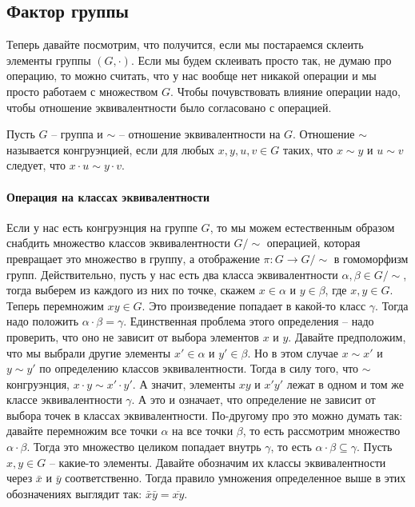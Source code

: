 \subsection{Фактор группы}
\label{section::QuotientGroup}

Теперь давайте посмотрим, что получится, если мы постараемся склеить элементы группы $(G, \cdot)$.
Если мы будем склеивать просто так, не думаю про операцию, то можно считать, что у нас вообще нет никакой операции и мы просто работаем с множеством $G$.
Чтобы почувствовать влияние операции надо, чтобы отношение эквивалентности было согласовано с операцией.

\begin{definition}
\label{def::Congruence}
Пусть $G$ -- группа и $\sim$ -- отношение эквивалентности на $G$.
Отношение $\sim$ называется конгруэнцией, если для любых $x,y,u,v\in G$ таких, что $x\sim y$ и $u\sim v$ следует, что $x \cdot u \sim y \cdot v$.
\end{definition}

\paragraph{Операция на классах эквивалентности}

Если у нас есть конгруэнция на группе $G$, то мы можем естественным образом снабдить множество классов эквивалентности $G/{\sim}$ операцией, которая превращает это множество в группу, а отображение $\pi \colon G\to G/{\sim}$ в гомоморфизм групп.
Действительно, пусть у нас есть два класса эквивалентности $\alpha,\beta\in G/{\sim}$, тогда выберем из каждого из них по точке, скажем $x\in \alpha$ и $y\in \beta$, где $x,y\in G$.
Теперь перемножим $xy\in G$.
Это произведение попадает в какой-то класс $\gamma$.
Тогда надо положить $\alpha\cdot \beta=\gamma$.
Единственная проблема этого определения -- надо проверить, что оно не зависит от выбора элементов $x$ и  $y$.
Давайте предположим, что мы выбрали другие элементы $x'\in \alpha$ и $y'\in \beta$.
Но в этом случае $x\sim x'$ и $y\sim y'$ по определению классов эквивалентности.
Тогда в силу того, что $\sim$ конгруэнция, $x\cdot y \sim x' \cdot y'$.
А значит, элементы $xy$ и $x'y'$ лежат в одном и том же классе эквивалентности $\gamma$.
А это и означает, что определение не зависит от выбора точек в классах эквивалентности.
По-другому про это можно думать так: давайте перемножим все точки $\alpha$ на все точки $\beta$, то есть рассмотрим множество $\alpha \cdot \beta$.
Тогда это множество целиком попадает внутрь $\gamma$, то есть $\alpha \cdot \beta \subseteq \gamma$.
Пусть $x,y\in G$ -- какие-то элементы.
Давайте обозначим их классы эквивалентности через $\bar x$ и $\bar y$ соответственно.
Тогда правило умножения определенное выше в этих обозначениях выглядит так: $\bar x  \bar y = \overline{xy}$.

